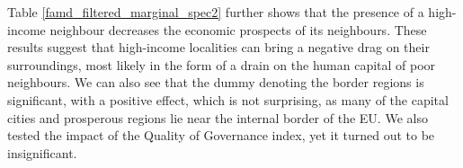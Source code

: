 \documentclass[11pt]{article}
\begin{document}
Table \ref{famd_filtered_marginal_spec2} further shows that the presence of a high-income neighbour decreases the economic prospects of its neighbours. These results suggest that high-income localities can bring a negative drag on their surroundings, most likely in the form of a drain on the human capital of poor neighbours. We can also see that the dummy denoting the border regions is significant, with a positive effect, which is not surprising, as many of the capital cities and prosperous regions lie near the internal border of the EU. We also tested the impact of the Quality of Governance index, yet it turned out to be insignificant.

\begin{table}[!htbp] \centering
{}
\end{table}
\end{document}
